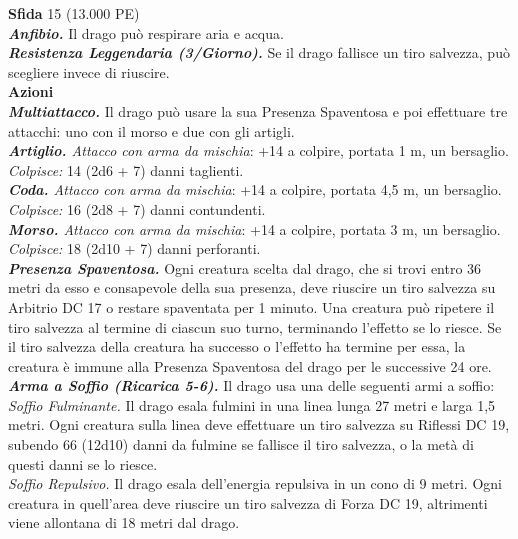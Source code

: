 \begin{multicols}{2}
\textbf{Sfida} 15 (13.000 PE)\smallskip\\
\emph{\textbf{Anfibio.}} Il drago può respirare aria e acqua.\\
\emph{\textbf{Resistenza Leggendaria (3/Giorno).}} Se il drago fallisce un tiro salvezza, può scegliere invece di riuscire.\\
\smallskip\textbf{Azioni}\\
\emph{\textbf{Multiattacco.}} Il drago può usare la sua Presenza Spaventosa e poi effettuare tre attacchi: uno con il morso e due con gli artigli.\\
\emph{\textbf{Artiglio.} Attacco con arma da mischia}: +14 a colpire, portata 1 m, un bersaglio.\\
\emph{Colpisce:} 14 (2d6 + 7) danni taglienti.\\
\emph{\textbf{Coda.} Attacco con arma da mischia}: +14 a colpire, portata 4,5 m, un bersaglio.\\
\emph{Colpisce:} 16 (2d8 + 7) danni contundenti.\\
\emph{\textbf{Morso.} Attacco con arma da mischia}: +14 a colpire, portata 3 m, un bersaglio.\\
\emph{Colpisce:} 18 (2d10 + 7) danni perforanti.\\
\emph{\textbf{Presenza Spaventosa.}} Ogni creatura scelta dal drago, che si trovi entro 36 metri da esso e consapevole della sua presenza, deve riuscire un tiro salvezza su Arbitrio DC 17 o restare spaventata per 1 minuto. Una creatura può ripetere il tiro salvezza al termine di ciascun suo turno, terminando l'effetto se lo riesce. Se il tiro salvezza della creatura ha successo o l'effetto ha termine per essa, la creatura è immune alla Presenza Spaventosa del drago per le successive 24 ore.\\
\emph{\textbf{Arma a Soffio (Ricarica 5-6).}} Il drago usa una delle seguenti armi a soffio:\\
\emph{Soffio Fulminante.} Il drago esala fulmini in una linea lunga 27 metri e larga 1,5 metri. Ogni creatura sulla linea deve effettuare un tiro salvezza su Riflessi DC 19, subendo 66 (12d10) danni da fulmine se fallisce il tiro salvezza, o la metà di questi danni se lo riesce.\\
\emph{Soffio Repulsivo.} Il drago esala dell'energia repulsiva in un cono di 9 metri. Ogni creatura in quell'area deve riuscire un tiro salvezza di Forza DC 19, altrimenti viene allontana di 18 metri dal drago.\\


\end{multicols}
